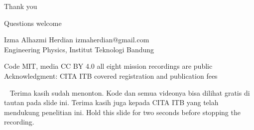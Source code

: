 \documentclass[aspectratio=169,11pt,t]{beamer}
\begin{document}
{
\begin{frame}[plain]
  \vskip8mm
  {\color{epicwhite}\headfont\fontsize{30}{34}\selectfont Thank you\par}
  \vskip18mm
  {\color{epicrust}\headfont\normalsize Questions welcome\par}
  \vskip3mm
  {\color{epicbody}\small
   Izma Alhazmi Herdian \textperiodcentered{} izmaherdian@gmail.com\\
   Engineering Physics, Institut Teknologi Bandung\par}
  \vskip5mm
  {\color{epicmuted}\small
   Code MIT, media CC BY 4.0 \textperiodcentered{} all eight mission recordings
   are public\\
   Acknowledgment: CITA ITB covered registration and publication fees\par}
  \vfill
  \hbox{\playlistqr[13mm]\hskip4mm
    }
    {Terima kasih sudah menonton. Kode dan semua videonya bisa dilihat gratis di tautan pada slide ini. Terima kasih juga kepada CITA ITB yang telah mendukung penelitian ini.}
    {Hold this slide for two seconds before stopping the recording.}
\end{frame}}
\end{document}
